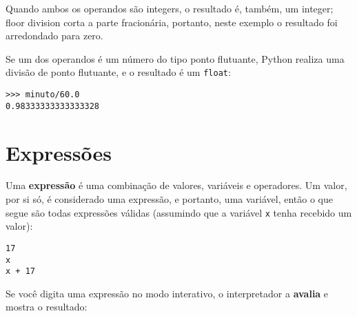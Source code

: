 
Quando ambos os operandos são integers, o resultado é, também,
um integer; floor division corta a parte fracionária,
portanto, neste exemplo o resultado foi arredondado para zero.

Se um dos operandos é um número do tipo ponto flutuante, Python realiza 
uma divisão de ponto flutuante, e o resultado é um {\tt float}:

\beforeverb
\begin{verbatim}
>>> minuto/60.0
0.98333333333333328
\end{verbatim}
\afterverb

\section{Expressões}

Uma {\bf expressão} é uma combinação de valores, variáveis e operadores. 
Um valor, por si só, é considerado uma expressão, e portanto,
uma variável, então o que segue são todas expressões válidas 
(assumindo que a variável {\tt x} tenha recebido um valor):


\beforeverb
\begin{verbatim}
17
x
x + 17
\end{verbatim}
\afterverb
%

Se você digita uma expressão no modo interativo, o interpretador
a {\bf avalia} e mostra o resultado:

